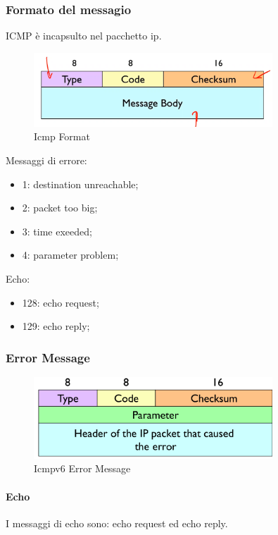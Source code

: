\documentclass[12pt]{article}
\begin{document}
\subsubsection{Formato del messagio}
ICMP \`e incapsulto nel pacchetto ip.
\begin{figure}[H]
    \centering
    \includegraphics[width=0.8\textwidth]{icmp-format.png}
    \caption{Icmp Format}
    \label{fig:icmp-format}
\end{figure}
Messaggi di errore:
\begin{itemize}
    \item 1: destination unreachable;
    \item 2: packet too big;
    \item 3: time exeeded;
    \item 4: parameter problem;
\end{itemize}
Echo:
\begin{itemize}
    \item 128: echo request;
    \item 129: echo reply;
\end{itemize}

\subsubsection{Error Message}
\begin{figure}[H]
    \centering
    \includegraphics[width=0.8\textwidth]{icmpv6-error-message.png}
    \caption{Icmpv6 Error Message}
    \label{fig:icmpv6-error-message}
\end{figure}

\paragraph{Echo}
I messaggi di echo sono: echo request ed echo reply.
\end{document}
